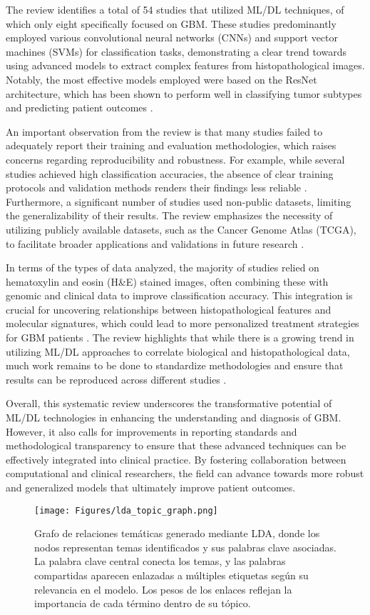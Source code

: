 \documentclass[runningheads]{llncs}
\begin{document}
The review identifies a total of 54 studies that utilized ML/DL techniques, of which only eight specifically focused on GBM. These studies predominantly employed various convolutional neural networks (CNNs) and support vector machines (SVMs) for classification tasks, demonstrating a clear trend towards using advanced models to extract complex features from histopathological images. Notably, the most effective models employed were based on the ResNet architecture, which has been shown to perform well in classifying tumor subtypes and predicting patient outcomes \cite{Chun_2025}.

An important observation from the review is that many studies failed to adequately report their training and evaluation methodologies, which raises concerns regarding reproducibility and robustness. For example, while several studies achieved high classification accuracies, the absence of clear training protocols and validation methods renders their findings less reliable \cite{Chun_2025}. Furthermore, a significant number of studies used non-public datasets, limiting the generalizability of their results. The review emphasizes the necessity of utilizing publicly available datasets, such as the Cancer Genome Atlas (TCGA), to facilitate broader applications and validations in future research \cite{Chun_2025}.

In terms of the types of data analyzed, the majority of studies relied on hematoxylin and eosin (H\&E) stained images, often combining these with genomic and clinical data to improve classification accuracy. This integration is crucial for uncovering relationships between histopathological features and molecular signatures, which could lead to more personalized treatment strategies for GBM patients \cite{Chun_2025}. The review highlights that while there is a growing trend in utilizing ML/DL approaches to correlate biological and histopathological data, much work remains to be done to standardize methodologies and ensure that results can be reproduced across different studies \cite{Chun_2025}.

Overall, this systematic review underscores the transformative potential of ML/DL technologies in enhancing the understanding and diagnosis of GBM. However, it also calls for improvements in reporting standards and methodological transparency to ensure that these advanced techniques can be effectively integrated into clinical practice. By fostering collaboration between computational and clinical researchers, the field can advance towards more robust and generalized models that ultimately improve patient outcomes.
\begin{figure}[h]
\centering
\texttt{[image: Figures/lda\_topic\_graph.png]}
\caption{Grafo de relaciones temáticas generado mediante LDA, donde los nodos representan temas identificados y sus palabras clave asociadas. La palabra clave central conecta los temas, y las palabras compartidas aparecen enlazadas a múltiples etiquetas según su relevancia en el modelo. Los pesos de los enlaces reflejan la importancia de cada término dentro de su tópico.}
\end{figure}
\end{document}
